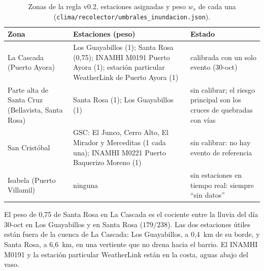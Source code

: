 \documentclass{sosg-informe}
\begin{document}
\begin{table}[ht]
  \centering\small
  \caption{Zonas de la regla v0.2, estaciones asignadas y peso $w_s$ de cada una (\texttt{clima/recolector/umbrales\_inundacion.json}).}
  \label{tab:zonas}
  \begin{tabularx}{\linewidth}{>{\raggedright\arraybackslash}p{3.3cm}>{\raggedright\arraybackslash}X>{\raggedright\arraybackslash}p{3.6cm}}
    \toprule
    Zona & Estaciones (peso) & Estado \\
    \midrule
    La Cascada (Puerto Ayora) & Los Guayabillos (1); Santa Rosa (0,75); INAMHI M0191 Puerto Ayora (1); estación particular WeatherLink de Puerto Ayora (1) & calibrada con un solo evento (30-oct) \\
    \addlinespace
    Parte alta de Santa Cruz (Bellavista, Santa Rosa) & Santa Rosa (1); Los Guayabillos (1) & sin calibrar; el riesgo principal son los cruces de quebradas con vías \\
    \addlinespace
    San Cristóbal & GSC: El Junco, Cerro Alto, El Mirador y Merceditas (1 cada una); INAMHI M0221 Puerto Baquerizo Moreno (1) & sin calibrar: no hay evento de referencia \\
    \addlinespace
    Isabela (Puerto Villamil) & ninguna & sin estaciones en tiempo real: siempre \enquote{sin datos} \\
    \bottomrule
  \end{tabularx}
\end{table}

El peso de 0,75 de Santa Rosa en La Cascada es el cociente entre la lluvia del día 30-oct en Los Guayabillos y en Santa Rosa ($179/238$). Las dos estaciones útiles están fuera de la cuenca de La Cascada: Los Guayabillos, a 0,4~km de su borde, y Santa Rosa, a 6,6~km, en una vertiente que no drena hacia el barrio. El INAMHI M0191 y la estación particular WeatherLink están en la costa, aguas abajo del vaso.
\end{document}
